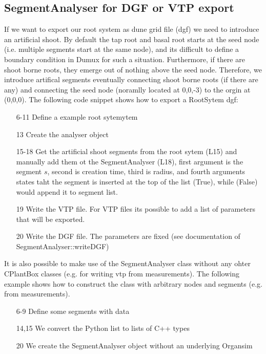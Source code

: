 \subsection{SegmentAnalyser for DGF or VTP export}

If we want to export our root system as dune grid file (dgf) we need to introduce an artificial shoot. By default the tap root and basal root starts at the seed node (i.e. multiple segments start at the same node), and its difficult to define a boundary condition in Dumux for such a situation. Furthermore, if there are shoot borne roots, they emerge out of nothing above the seed node. Therefore, we introduce artifical segments eventually connecting shoot borne roots (if there are any) and connecting the seed node (noramlly located at 0,0,-3) to the orgin at (0,0,0). The following code snippet shows how to export a RootSytem dgf:



\begin{itemize}
 \item[6-11] Define a example root sytemytem
 \item[13] Create the analyser object
 \item[15-18] Get the artificial shoot segments from the root sytem (L15) and manually add them ot the SegmentAnalyser (L18), first argument is the segment $s$, second is creation time, third is radius, and fourth arguments states taht the segment is inserted at the top of the list (True), while (False) would append it to segment list.
 \item[19] Write the VTP file. For VTP files its possible to add a list of parameters that will be exported. 
 \item[20] Write the DGF file. The parameters are fixed (see documentation of SegmentAnalyser::writeDGF)
\end{itemize}

It is also possible to make use of the SegmentAnalyser class without any ohter CPlantBox classes (e.g. for writing vtp from measurements). The following example shows how to construct the class with arbitrary nodes and segments (e.g. from measurements). 



\begin{itemize}
 \item[6-9] Define some segments with data
 \item[14,15] We convert the Python list to lists of C++ types
 \item[20] We create the SegmentAnalyser object without an underlying Organsim
\end{itemize}

